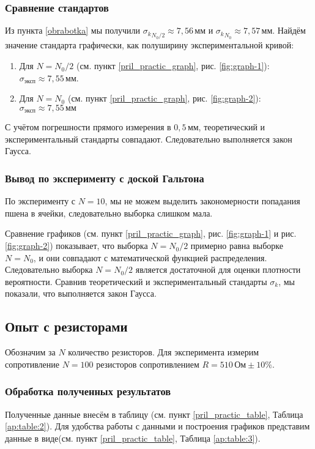 \subsubsection{Сравнение стандартов}

Из пункта \ref{obrabotka} мы получили ${\sigma_k}_{N_0 / 2} \approx 7,56 \, \text{мм}$ и ${\sigma_k}_{N_0} \approx 7,57 \, \text{мм}$. Найдём значение стандарта графически, как полуширину экспериментальной кривой: 

\begin{enumerate}
	\item 
	{
		Для $N = N_0 / 2$ (см. пункт \ref{pril_practic_graph}, рис. \ref{fig:graph-1}): $\sigma_{\text{эксп}} \approx 7,55 \, \text{мм}$. 
	}
	\item 
	{
		Для $N = N_0$ (см. пункт \ref{pril_practic_graph}, рис. \ref{fig:graph-2}): $\sigma_{\text{эксп}} \approx 7,55 \, \text{мм}$
	}
\end{enumerate}

С учётом погрешности прямого измерения в $0,5 \, \text{мм}$, теоретический и экспериментальный стандарты совпадают. Следовательно выполняется закон Гаусса.

\subsubsection{Вывод по эксперименту с доской Гальтона}

По эксперименту с $N = 10$, мы не можем выделить закономерности попадания пшена в ячейки, следовательно выборка слишком мала. 

Сравнение графиков (см. пункт \ref{pril_practic_graph}, рис. \ref{fig:graph-1} и рис. \ref{fig:graph-2}) показывает, что выборка $N = N_0/2$ примерно равна выборке $N = N_0$, и они совпадают с математической функцией распределения. Следовательно выборка $N = N_0/2$ является достаточной для оценки плотности вероятности. Сравнив теоретический и экспериментальный стандарты $\sigma_k$, мы показали, что выполняется закон Гаусса.

\subsection{Опыт с резисторами}
 
Обозначим за $N$ количество резисторов. Для эксперимента измерим сопротивление $N = 100$ резисторов сопротивлением $R = 510\,\text{Ом}\pm10\%$. 

\subsubsection{Обработка полученных результатов}
Полученные данные внесём в таблицу (см. пункт \ref{pril_practic_table}, Таблица \ref{ap:table:2}). Для удобства работы с данными и построения графиков представим данные в виде(см. пункт \ref{pril_practic_table}, Таблица \ref{ap:table:3}).

